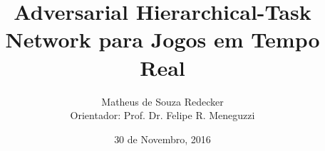 \documentclass{beamer}
\title[\fontsize{0.08cm}{1em}\selectfont AHTN para Jogos em Tempo Real]{Adversarial Hierarchical-Task Network para Jogos em Tempo Real}
\author[Matheus de Souza Redecker]{Matheus de Souza Redecker
\\{\footnotesize Orientador: Prof. Dr. Felipe R. Meneguzzi}
}
\institute[PUCRS]{Pontifícia Universidade Católica do Rio Grande do Sul
\medskip\\
\url{matheus.redecker@acad.pucrs.br}
}
\date{30 de Novembro, 2016}
\begin{document}

    \begin{frame}
        \titlepage
    \end{frame}


\end{document}
